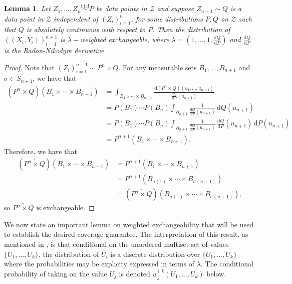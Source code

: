 \documentclass[11pt, titlepage]{article} %
\newcommand{\R}{\mathrm}
\numberwithin{equation}{section}
\newtheorem{lemma}{Lemma}
\theoremstyle{definition}
\numberwithin{theorem}{section}
\numberwithin{lemma}{section}
\numberwithin{corollary}{section}
\numberwithin{proposition}{section}
\numberwithin{definition}{section}
\numberwithin{remark}{section}
\begin{document}
\begin{lemma}
    Let \(Z_1, \ldots, Z_n \overset{\R{i.i.d}}{\sim} P \) be data points in \(\mathcal{Z}\) and suppose \(Z_{n+1} \sim Q\) is a data point in \(\mathcal{Z}\) independent of \((Z_i)_{i=1}^n\), for some distributions \(P, Q\) on \(\mathcal{Z}\) such that \(Q\) is absolutely continuous with respect to \(P\). Then the distribution of \(((X_i, Y_i))_{i=1}^{n+1}\) is \(\lambda-\)weighted exchangeable, where \(\lambda = \left(1, \ldots, 1, \frac{\R{d}Q}{\R{d}P}\right)\) and \(\frac{\R{d}Q}{\R{d}P}\) is the Radon-Nikodym derivative.
\label{lemma:dist_shift_weighted_exch}
\end{lemma}
\begin{proof}
    Note that \((Z_i)_{i=1}^{n+1} \sim P^{n} \times Q\). For any measurable sets \(B_1, \ldots, B_{n+1}\) and \(\sigma \in S_{n+1}\), we have that \begin{align*}
        (\overline{P^n \times Q})(B_1 \times \cdots \times B_{n+1}) &= \int_{B_1 \times \cdots \times B_{n+1}} \frac{\R{d}(P^n \times Q)(u_1, \ldots, u_{n+1})}{\frac{\R{d}Q}{\R{d}P}(u_{n+1})} \\
        &= P(B_1) \cdots P(B_n) \int_{B_{n+1}} \frac{1}{\frac{\R{d}Q}{\R{d}P}(u_{n+1})} \, \R{d}Q(u_{n+1}) \\
        &= P(B_1) \cdots P(B_n) \int_{B_{n+1}} \frac{1}{\frac{\R{d}Q}{\R{d}P}(u_{n+1})} \, \frac{\R{d}Q}{\R{d}P}(u_{n+1}) \, \R{d}P(u_{n+1}) \\
        &= P^{n+1}(B_1 \times \cdots \times B_{n+1}).
    \end{align*}
    Therefore, we have that \begin{align*}
        (\overline{P^n \times Q})(B_1 \times \cdots \times B_{n+1}) &= P^{n+1}(B_1 \times \cdots \times B_{n+1}) \\
        &= P^{n+1}(B_{\sigma(1)} \times \cdots \times B_{\sigma(n+1)}) \\
        &= (\overline{P^n \times Q})(B_{\sigma(1)} \times \cdots \times B_{\sigma(n+1)}),
    \end{align*} so \(\overline{P^n \times Q}\) is exchangeable.
\end{proof}

\noindent
We now state an important lemma on weighted exchangeability that will be used to establish the desired coverage guarantee. The interpretation of this result, as mentioned in \cite{barber2024finetti}, is that conditional on the unordered multiset set of values \(\{U_1, \ldots, U_k\}\), the distribution of \(U_i\) is a discrete distribution over \(\{U_1, \ldots, U_k\}\) where the probabilities may be explicity expressed in terms of \(\lambda\). The conditional probability of taking on the value \(U_j\) is denoted \(w^{i, k}_j(U_1, \ldots, U_k)\) below. \vskip5pt
\end{document}
